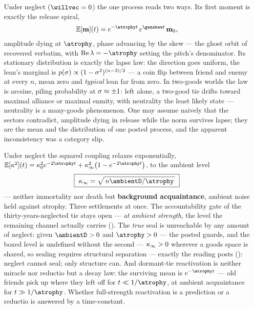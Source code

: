\documentclass[../main]{subfiles}
\begin{document}
\begin{theorem}%
  Under neglect ($\willvec=0$) the one process reads two ways. Its first moment is
  exactly the release spiral,
  \begin{equation}
    \mathbb E[\mathbf m](t)=e^{-\atrophy t}\,e^{\genskew t}\,\mathbf m_{0},
    \label{eq:dyn:reconcile}
  \end{equation}
  amplitude dying at $\atrophy$, phase advancing by the skew --- the ghost orbit of
   recovered verbatim, with $\operatorname{Re}\eigval=-\atrophy$
  setting the pitch's denominator. Its stationary distribution is exactly the lapse
  law: the direction goes uniform, the lean's marginal is
  $p(\sigma)\propto(1-\sigma^{2})^{(n-3)/2}$ --- a coin flip between friend and
  enemy at every $n$, mean zero and \emph{typical} lean far from zero. In two-goods
  worlds the law is arcsine, piling probability at $\sigma\approx\pm1$: left
  alone, a two-good tie drifts toward maximal alliance or maximal enmity, with
  neutrality the least likely state --- neutrality is a many-goods phenomenon. One
  may assume naively that the sectors contradict, amplitude dying in release while
  the norm survives lapse; they are the mean and the distribution of one posted
  process, and the apparent inconsistency was a category slip.
\end{theorem}

\begin{theorem}%
  Under neglect the squared coupling relaxes exponentially,
  $\mathbb E[\kappa^{2}](t)=\kappa_{0}^{2}e^{-2\atrophy t}
    +\ambientcoupling^{2}\bigl(1-e^{-2\atrophy t}\bigr)$, to the ambient level
  \begin{equation}
    \boxed{\ \ambientcoupling=\sqrt{\,n\ambientD/\atrophy\,}\ }
    \label{eq:dyn:floor}
  \end{equation}
  --- neither immortality nor death but \textbf{background acquaintance}, ambient
  noise held against atrophy. Three settlements at once. The accountability gate of
  the thirty-years-neglected tie stays open --- \emph{at ambient strength}, the level
  the remaining channel actually carries (). The \emph{true} seal is
  unreachable by any amount of neglect: given $\ambientD>0$ and $\atrophy>0$ ---
  the posted guards, and the boxed level is undefined without the second ---
  $\kappa\sb{\infty}>0$ wherever a goods space
  is shared, so sealing requires structural separation --- exactly the reading
   posts (): neglect cannot seal; only structure
  can. And dormant-tie reactivation is neither miracle nor reductio but a decay law:
  the surviving mean is $e^{-\atrophy t}$ --- old friends pick up where they left off
  for $t\ll1/\atrophy$, at ambient acquaintance for $t\gg1/\atrophy$. Whether
  full-strength reactivation is a prediction or a reductio is answered by a
  time-constant.
\end{theorem}
\end{document}
